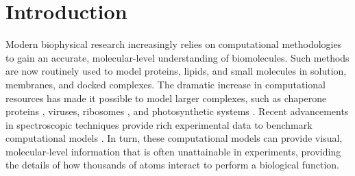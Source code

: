 \chapter{Introduction} \label{intro}


Modern biophysical research increasingly relies on computational methodologies to gain an accurate, molecular-level understanding of biomolecules. 
Such methods are now routinely used to model proteins, lipids, and small molecules in solution, membranes, and docked complexes. 
The dramatic increase in computational resources has made it possible to model larger complexes, such as chaperone proteins \cite{Piana2018}, viruses\cite{Zhao2013, Andoh2014}, ribosomes \cite{Bock2013}, and photosynthetic systems \cite{Chandler2014, Perilla2015}.
Recent advancements in spectroscopic techniques provide rich experimental data to benchmark computational models \cite{Hirota1997, Hochlaf2017, Srinivasan2017, Wang2014, Case2002}. 
In turn, these computational models can provide visual, molecular-level information that is often unattainable in experiments, providing the details of how thousands of atoms interact to perform a biological function. 

